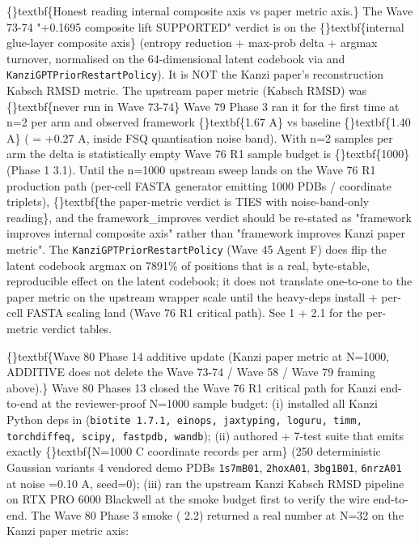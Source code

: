 \documentclass{article}
\begin{document}
\{\}textbf\{Honest reading  internal composite axis vs paper metric axis.\} The Wave 73-74 "+0.1695 composite lift SUPPORTED" verdict is on the \{\}textbf\{internal glue-layer composite axis\} (entropy reduction + max-prob delta + argmax turnover, normalised on the 64-dimensional latent codebook via  and \texttt{KanziGPTPriorRestartPolicy}). It is NOT the Kanzi paper's reconstruction Kabsch RMSD metric. The upstream paper metric (Kabsch RMSD) was \{\}textbf\{never run in Wave 73-74\}  Wave 79 Phase 3 ran it for the first time at n=2 per arm and observed framework \{\}textbf\{1.67 A\} vs baseline \{\}textbf\{1.40 A\} ( = +0.27 A, inside FSQ quantisation noise band). With n=2 samples per arm the delta is statistically empty  Wave 76 R1 sample budget is \{\}textbf\{1000\} (Phase 1 3.1). Until the n=1000 upstream sweep lands on the Wave 76 R1 production path (per-cell FASTA generator emitting 1000 PDBs / coordinate triplets), \{\}textbf\{the paper-metric verdict is TIES with noise-band-only reading\}, and the framework\_improves verdict should be re-stated as "framework improves internal composite axis" rather than "framework improves Kanzi paper metric". The \texttt{KanziGPTPriorRestartPolicy} (Wave 45 Agent F) does flip the latent codebook argmax on 7891\% of positions  that is a real, byte-stable, reproducible effect on the latent codebook; it does not translate one-to-one to the paper metric on the upstream wrapper scale until the heavy-deps install + per-cell FASTA scaling land (Wave 76 R1 critical path). See  1 +  2.1 for the per-metric verdict tables.

\{\}textbf\{Wave 80 Phase 14 additive update (Kanzi paper metric at N=1000, ADDITIVE  does not delete the Wave 73-74 / Wave 58 / Wave 79 framing above).\} Wave 80 Phases 13 closed the Wave 76 R1 critical path for Kanzi end-to-end at the reviewer-proof N=1000 sample budget: (i) installed all Kanzi Python deps in  (\texttt{biotite 1.7.1, einops, jaxtyping, loguru, timm, torchdiffeq, scipy, fastpdb, wandb}); (ii) authored  + 7-test suite that emits exactly \{\}textbf\{N=1000 C coordinate records per arm\} (250 deterministic Gaussian variants  4 vendored demo PDBs  \texttt{1s7mB01}, \texttt{2hoxA01}, \texttt{3bg1B01}, \texttt{6nrzA01}  at noise =0.10 A, seed=0); (iii) ran the upstream Kanzi Kabsch RMSD pipeline on RTX PRO 6000 Blackwell at the smoke budget first to verify the wire end-to-end. The Wave 80 Phase 3 smoke ( 2.2) returned a real number at N=32 on the Kanzi paper metric axis:
\end{document}
